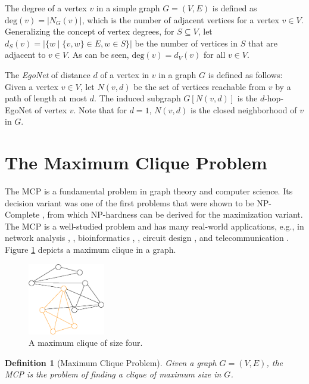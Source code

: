 \documentclass[draft,final]{vutinfth} %
\newtheorem{definition}{Definition}[section]
\begin{document}
The degree of a vertex $v$ in a simple graph $G = (V,E)$ is defined as $\mathrm{deg}(v) = |N_G(v)|$, which is the number of adjacent vertices for a vertex $v \in V$. Generalizing the concept of vertex degrees, for $S \subseteq V$, let $d_S(v) = |\{w \mid \{v,w\} \in E, w \in S\}|$ be the number of vertices in $S$ that are adjacent to $v \in V$. As can be seen, $\mathrm{deg}(v) = d_V(v) $ for all $v \in V$. 

The \emph{EgoNet} of distance $d$ of a vertex in $v$ in a graph $G$ is defined as follows: Given a vertex $v \in V$, let $N(v, d)$ be the set of vertices reachable from $v$ by a path of length at most $d$. The induced subgraph $G[N(v, d)]$ is the $d$-hop-EgoNet of vertex $v$. Note that for $d=1$, $N(v, d)$ is the closed neighborhood of $v$ in $G$.     


\section{The Maximum Clique Problem}\label{sec:mcp}

The MCP is a fundamental problem in graph theory and computer science. Its decision variant was one of the first problems that were shown to be NP-Complete \cite{Karp1972}, from which NP-hardness can be derived for the maximization variant. The MCP is a well-studied problem and has many real-world applications, e.g., in network analysis \cite{Fortunato09}, \cite{Palla2005}, bioinformatics \cite{Depolli2013}, \cite{BUTENKO20061}, circuit design \cite{LeckyMA89}, and telecommunication \cite{DouikSAA14}. 
Figure \ref{fig:maxclique} depicts a maximum clique in a graph. 
\begin{figure}
    \centering
    \includegraphics[width=0.3\textwidth]{graphics/graph1-clique.eps}
    \caption{A maximum clique of size four.}
    \label{fig:maxclique}
\end{figure}

\begin{definition}[Maximum Clique Problem]
	\label{def:mcp}
	Given a graph $G = (V,E)$, the MCP is the problem of finding a clique of maximum size in $G$. 
\end{definition}
\end{document}
